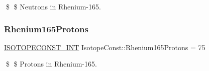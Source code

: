 \$ \$ Neutrons in Rhenium-\/165. \mbox{\label{group___isotope_const-_rhenium-_re165_ga4cbc5d21470c457f10f85dc8143631bb}} 
\subsubsection{\texorpdfstring{Rhenium165\+Protons}{Rhenium165Protons}}
{\footnotesize\ttfamily \mbox{\hyperlink{group___isotope_const-_macros_ga5f18360b3e99483a35c32d789e62621c}{I\+S\+O\+T\+O\+P\+E\+C\+O\+N\+S\+T\+\_\+\+I\+NT}} Isotope\+Const\+::\+Rhenium165\+Protons = 75}

\$ \$ Protons in Rhenium-\/165. 